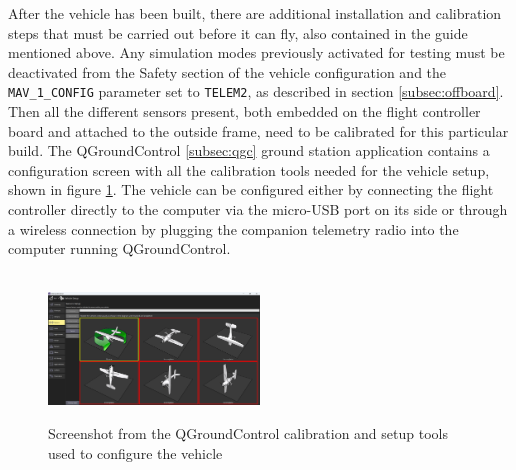 After the vehicle has been built, there are additional installation and calibration steps that must be carried out before it can fly, also contained in the guide mentioned above.
Any simulation modes previously activated for testing must be deactivated from the Safety section of the vehicle configuration and the \texttt{MAV\_1\_CONFIG} parameter set to \texttt{TELEM2}, as described in section \ref{subsec:offboard}.
Then all the different sensors present, both embedded on the flight controller board and attached to the outside frame, need to be calibrated for this particular build.
The QGroundControl \ref{subsec:qgc} ground station application contains a configuration screen with all the calibration tools needed for the vehicle setup, shown in figure \ref{fig:qgc-config}.
The vehicle can be configured either by connecting the flight controller directly to the computer via the micro-USB port on its side or through a wireless connection by plugging the companion telemetry radio into the computer running QGroundControl.


\begin{figure}
  \centering
  \\
  \includegraphics[width=0.5\textwidth, keepaspectratio]{img/qgc-config-2.png}
  \caption{Screenshot from the QGroundControl calibration and setup tools used to configure the vehicle}\label{fig:qgc-config}
\end{figure}


